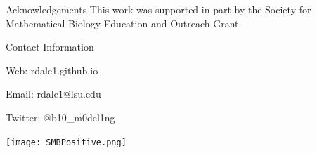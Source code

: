 \documentclass[final]{beamer}
\newlength{\sepwid}
\newlength{\onecolwid}
\newlength{\twocolwid}
\begin{document}
\begin{frame}[t]
\begin{columns}[t]
\begin{column}{\twocolwid}
\begin{columns}[t,totalwidth=\twocolwid]
\begin{column}{\onecolwid} %

\vspace{-1cm}
\begin{block}{Acknowledgements}	
	\small{This work was supported in part by the Society for Mathematical Biology Education and Outreach Grant. } \\	
\end{block}

\begin{alertblock}{Contact Information}
	
	\begin{itemize}
		\small{
			\item Web: {rdale1.github.io}
			\item Email: {rdale1@lsu.edu}
			\item Twitter: @b10\_m0del1ng}
	\end{itemize}
	
\end{alertblock}

\centering
		\texttt{[image: SMBPositive.png]}

\end{column} %

\end{columns} %

\end{column} %

\begin{column}{\sepwid}\end{column} %

\begin{column}{\onecolwid} %



\end{column}
\end{columns}
\end{frame}
\end{document}
